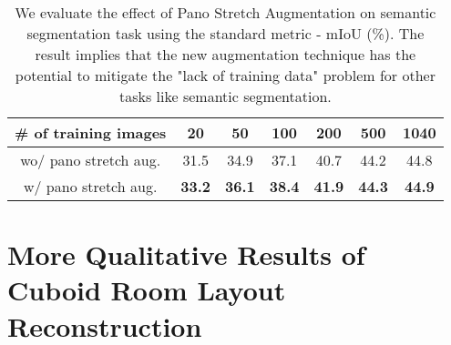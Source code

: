 \documentclass[10pt,twocolumn,letterpaper]{article}
\begin{document}
\begin{table}[h]
    \centering
    \begin{tabular}{c|cccccc} 
        \hline
        \# of training images & 20 & 50 & 100 & 200 & 500 & 1040 \\
        \hline
        wo/ pano stretch aug. & 31.5 & 34.9 & 37.1 & 40.7 & 44.2 & 44.8 \\
w/ pano stretch aug. & \textbf{33.2} & \textbf{36.1} & \textbf{38.4} & \textbf{41.9} & \textbf{44.3} & \textbf{44.9} \\
        \hline
    \end{tabular}

    \caption{
    We evaluate the effect of Pano Stretch Augmentation on semantic segmentation task using the standard metric - mIoU (\%).
    The result implies that the new augmentation technique has the potential to mitigate the "lack of training data" problem for other tasks like semantic segmentation.
    }
    \label{table:sem}
\end{table}
 \section{More Qualitative Results of Cuboid Room Layout Reconstruction}
\end{document}
